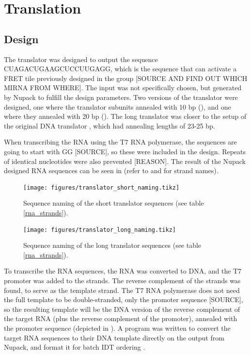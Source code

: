 \section{Translation}

\subsection{Design}

The translator was designed to output the sequence CUAGACUGAAGCUCCUUGAGG, which is the sequence that can activate a FRET tile previously designed in the group [SOURCE AND FIND OUT WHICH MIRNA FROM WHERE]. The input was not specifically chosen, but generated by Nupack to fulfill the design parameters. Two versions of the translator were designed, one where the translator subunits annealed with 10 bp (), and one where they annealed with 20 bp (). The long translator was closer to the setup of the original DNA translator \cite{Picuri2009}, which had annealing lengths of 23-25 bp.

When transcribing the RNA using the T7 RNA polymerase, the sequences are going to start with GG [SOURCE], so these were included in the design. Repeats of identical nucleotides were also prevented [REASON]. The result of the Nupack designed RNA sequences can be seen in  (refer to  and  for strand names).

\begin{figure}[h]
\centering
\texttt{[image: figures/translator\_short\_naming.tikz]}
\caption{Sequence naming of the short translator sequences (see table \ref{rna_strands}).}
\label{translator_short_subunits}
\end{figure}

\begin{figure}[h]
\centering
\texttt{[image: figures/translator\_long\_naming.tikz]}
\caption{Sequence naming of the long translator sequences (see table \ref{rna_strands}).}
\label{translator_long_subunits}
\end{figure}

To transcribe the RNA sequences, the RNA was converted to DNA, and the T7 promoter was added to the strands. The reverse complement of the strands was found, to serve as the template strand. The T7 RNA polymerase does not need the full template to be double-stranded, only the promoter sequence [SOURCE], so the resulting template will be the DNA version of the reverse complement of the target RNA (plus the reverse complement of the promoter), annealed with the promoter sequence (depicted in ). A program was written to convert the target RNA sequences to their DNA template directly on the output from Nupack, and format it for batch IDT ordering \cite{nupackorder}.

